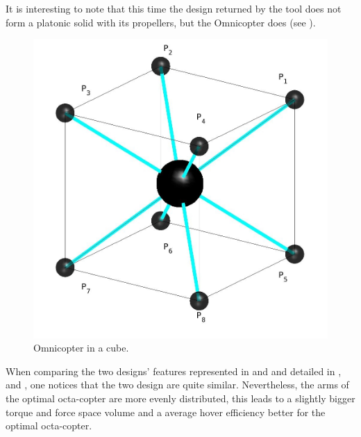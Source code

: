 It is interesting to note that this time the design returned by the tool does not
form a platonic solid with its propellers, but the Omnicopter does (see
).

\begin{figure}[!ht]
  \centering
  \includegraphics[width=0.5\linewidth]{images/Octa_cube.jpg}
  \caption{Omnicopter in a cube.} \label{fig:Octacopter_resultc}
\end{figure}

When comparing the two designs’ features represented in 
and  and detailed in ,
 and , one
notices that the two design are quite similar. Nevertheless, the arms of the optimal octa-copter
are more evenly distributed, this leads to a slightly bigger torque and force space volume
and a average hover efficiency better for the optimal octa-copter.\\\\\\\\

